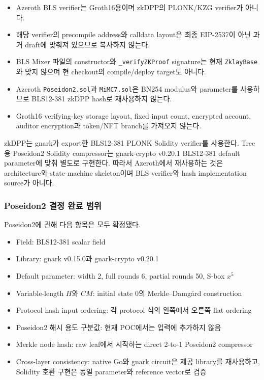 \documentclass[11pt]{extarticle}
\begin{document}
\begin{itemize}
  \item Azeroth BLS verifier는 Groth16용이며 zkDPP의 PLONK/KZG verifier가 아니다.
  \item 해당 verifier의 precompile address와 calldata layout은 최종 EIP-2537이 아닌
        과거 draft에 맞춰져 있으므로 복사하지 않는다.
  \item BLS Mixer 파일의 constructor와 \texttt{\_verifyZKProof} signature는 현재
        \texttt{ZklayBase}와 맞지 않으며 현 checkout의 compile/deploy target도 아니다.
  \item Azeroth \texttt{Poseidon2.sol}과 \texttt{MiMC7.sol}은 BN254 modulus와
        parameter를 사용하므로 BLS12-381 zkDPP hash로 재사용하지 않는다.
  \item Groth16 verifying-key storage layout, fixed input count, encrypted account,
        auditor encryption과 token/NFT branch를 가져오지 않는다.
\end{itemize}

zkDPP는 gnark가 export한 BLS12-381 PLONK Solidity verifier를 사용한다. Tree용
Poseidon2 Solidity compressor는 gnark-crypto v0.20.1 BLS12-381 default parameter에
맞춰 별도로 구현한다. 따라서 Azeroth에서 재사용하는 것은 architecture와 state-machine
skeleton이며 BLS verifier와 hash implementation source가 아니다.

\subsubsection{Poseidon2 결정 완료 범위}

Poseidon2에 관해 다음 항목은 모두 확정됐다.

\begin{itemize}
  \item Field: BLS12-381 scalar field
  \item Library: gnark v0.15.0과 gnark-crypto v0.20.1
  \item Default parameter: width 2, full rounds 6, partial rounds 50, S-box $x^5$
  \item Variable-length $H$와 $CM$: initial state 0의 Merkle--Damg\aa rd construction
  \item Protocol hash input ordering: 각 protocol 식의 왼쪽에서 오른쪽 flat ordering
  \item Poseidon2 해시 용도 구분값: 현재 POC에서는 입력에 추가하지 않음
  \item Merkle node hash: raw leaf에서 시작하는 direct 2-to-1 Poseidon2 compressor
  \item Cross-layer consistency: native Go와 gnark circuit은 제공 library를 재사용하고,
        Solidity 호환 구현은 동일 parameter와 reference vector로 검증
\end{itemize}
\end{document}
